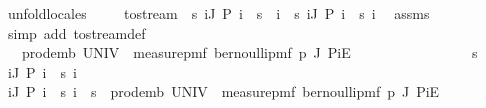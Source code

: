 \begin{isabellebody}
\ unfold{\isacharunderscore}{\kern0pt}locales\isanewline
\isanewline
\ \ \isamarkupfalse%
\ {\isacharasterisk}{\kern0pt}{\isacharcolon}{\kern0pt}\ {\isachardoublequoteopen}to{\isacharunderscore}{\kern0pt}stream\ {\isacharminus}{\kern0pt}{\isacharbackquote}{\kern0pt}\ {\isacharbraceleft}{\kern0pt}s{\isachardot}{\kern0pt}\ {\isasymforall}i{\isasymin}J{\isachardot}{\kern0pt}\ P\ i\ {\isacharequal}{\kern0pt}\ s\ {\isacharbang}{\kern0pt}{\isacharbang}{\kern0pt}\ i{\isacharbraceright}{\kern0pt}\ {\isacharequal}{\kern0pt}\ {\isacharbraceleft}{\kern0pt}s{\isachardot}{\kern0pt}\ {\isasymforall}i{\isasymin}J{\isachardot}{\kern0pt}\ P\ i\ {\isacharequal}{\kern0pt}\ s\ i{\isacharbraceright}{\kern0pt}{\isachardoublequoteclose}\ \isamarkupfalse%
\ assms\ \isamarkupfalse%
\ {\isacharparenleft}{\kern0pt}simp\ add{\isacharcolon}{\kern0pt}\ to{\isacharunderscore}{\kern0pt}stream{\isacharunderscore}{\kern0pt}def{\isacharparenright}{\kern0pt}\isanewline
\ \ \isamarkupfalse%
\ \isamarkupfalse%
\ {\isachardoublequoteopen}{\isachardot}{\kern0pt}{\isachardot}{\kern0pt}{\isachardot}{\kern0pt}\ {\isacharequal}{\kern0pt}\ prod{\isacharunderscore}{\kern0pt}emb\ UNIV\ {\isacharparenleft}{\kern0pt}{\isasymlambda}{\isacharunderscore}{\kern0pt}{\isachardot}{\kern0pt}\ measure{\isacharunderscore}{\kern0pt}pmf\ {\isacharparenleft}{\kern0pt}bernoulli{\isacharunderscore}{\kern0pt}pmf\ p{\isacharparenright}{\kern0pt}{\isacharparenright}{\kern0pt}\ J\ {\isacharquery}{\kern0pt}PiE{\isachardoublequoteclose}\isanewline
\ \ \isamarkupfalse%
\ {\isacharminus}{\kern0pt}\isanewline
\ \ \ \ \isacommand{{\isacharbraceleft}{\kern0pt}}\isamarkupfalse%
\isanewline
\ \ \ \ \ \ \isamarkupfalse%
\ s\ \isamarkupfalse%
\ {\isachardoublequoteopen}{\isacharparenleft}{\kern0pt}{\isasymforall}i{\isasymin}J{\isachardot}{\kern0pt}\ P\ i\ {\isacharequal}{\kern0pt}\ s\ i{\isacharparenright}{\kern0pt}{\isachardoublequoteclose}\isanewline
\ \ \ \ \ \ \isamarkupfalse%
\ {\isachardoublequoteopen}{\isacharparenleft}{\kern0pt}{\isasymforall}i{\isasymin}J{\isachardot}{\kern0pt}\ P\ i\ {\isacharequal}{\kern0pt}\ s\ i{\isacharparenright}{\kern0pt}\ {\isacharequal}{\kern0pt}\ {\isacharparenleft}{\kern0pt}s\ {\isasymin}\ prod{\isacharunderscore}{\kern0pt}emb\ UNIV\ {\isacharparenleft}{\kern0pt}{\isasymlambda}{\isacharunderscore}{\kern0pt}{\isachardot}{\kern0pt}\ measure{\isacharunderscore}{\kern0pt}pmf\ {\isacharparenleft}{\kern0pt}bernoulli{\isacharunderscore}{\kern0pt}pmf\ p{\isacharparenright}{\kern0pt}{\isacharparenright}{\kern0pt}\ J\ {\isacharquery}{\kern0pt}PiE{\isacharparenright}{\kern0pt}{\isachardoublequoteclose}\ \isanewline

\end{isabellebody}
